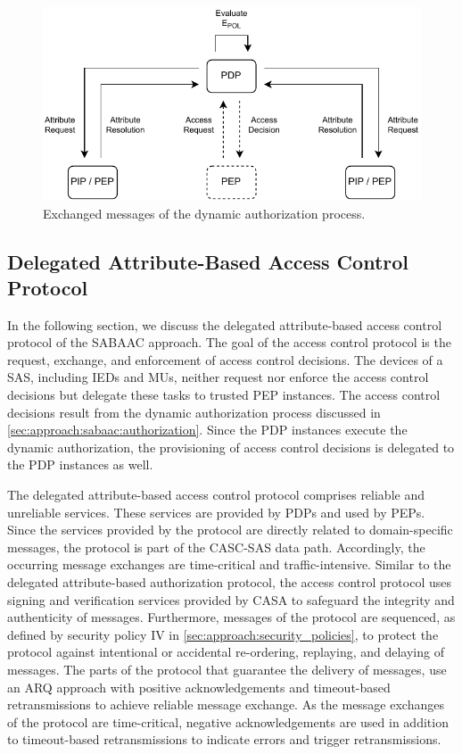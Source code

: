 \begin{description}
\begin{algorithm}
    \end{algorithm}
    \begin{figure}
        \centering
        \includegraphics[width=0.9\linewidth]{figures/SABAAC_protocols_authorization_dynamic.drawio.pdf}
        \caption{Exchanged messages of the dynamic authorization process.
        }
        \label{fig:sabaac_authorization_dynamic}
    \end{figure}
\end{description}

\subsection{Delegated Attribute-Based Access Control Protocol}
\label{sec:approach:sabaac:accesscontrol}
In the following section, we discuss the delegated attribute-based access control protocol of the SABAAC approach.
The goal of the access control protocol is the request, exchange, and enforcement of access control decisions.
The devices of a SAS, including IEDs and MUs, neither request nor enforce the access control decisions but delegate these tasks to trusted PEP instances.
The access control decisions result from the dynamic authorization process discussed in \autoref{sec:approach:sabaac:authorization}.
Since the PDP instances execute the dynamic authorization, the provisioning of access control decisions is delegated to the PDP instances as well.

The delegated attribute-based access control protocol comprises reliable and unreliable services.
These services are provided by PDPs and used by PEPs.
Since the services provided by the protocol are directly related to domain-specific messages, the protocol is part of the CASC-SAS data path.
Accordingly, the occurring message exchanges are time-critical and traffic-intensive.
Similar to the delegated attribute-based authorization protocol, the access control protocol uses signing and verification services provided by CASA to safeguard the integrity and authenticity of messages.
Furthermore, messages of the protocol are sequenced, as defined by security policy IV in \autoref{sec:approach:security_policies}, to protect the protocol against intentional or accidental re-ordering, replaying, and delaying of messages.
The parts of the protocol that guarantee the delivery of messages, use an ARQ approach with positive acknowledgements and timeout-based retransmissions to achieve reliable message exchange.
As the message exchanges of the protocol are time-critical, negative acknowledgements are used in addition to timeout-based retransmissions to indicate errors and trigger retransmissions.


